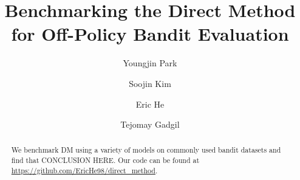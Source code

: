 \documentclass[sigplan,screen]{acmart}
\begin{document}
\title{Benchmarking the Direct Method for Off-Policy Bandit Evaluation}

\author{Youngjin Park}

\author{Soojin Kim}

\author{Eric He}

\author{Tejomay Gadgil}


\renewcommand{\shortauthors}{Gadgil, He, Kim, Park}

\begin{abstract}
  We benchmark DM using a variety of models on commonly used bandit datasets and find that CONCLUSION HERE. Our code can be found at \url{https://github.com/EricHe98/direct\_method}.
\end{abstract}



\end{document}
